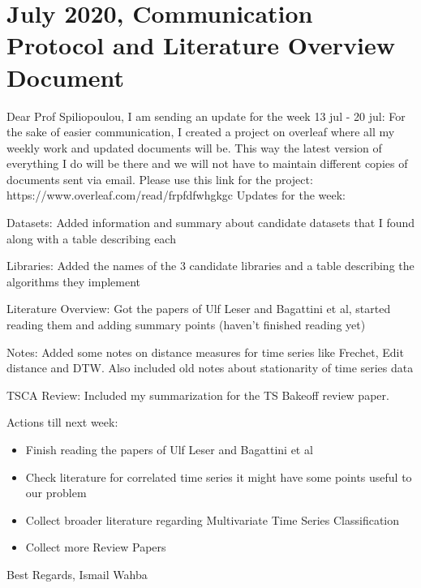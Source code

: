 \documentclass{article}
\newcommand{\cmark}{\ding{51}}%
\newcommand{\done}{\rlap{$\square$}{\raisebox{2pt}{\large\hspace{1pt}\cmark}}%
\hspace{-2.5pt}}
\begin{document}
 \section*{\texorpdfstring{}. July 2020, Communication Protocol and Literature Overview Document}
 Dear Prof Spiliopoulou,\newline
I am sending an update for the week 13 jul - 20 jul:
For the sake of easier communication, I created a project on overleaf where all my weekly work and updated documents will be. This way the latest version of everything I do will be there and we will not have to maintain different copies of documents sent via email.\newline
Please use this link for the project: https://www.overleaf.com/read/frpfdfwhgkgc
Updates for the week:
 \begin{todolist}
	\item [\done] Datasets: Added information and summary about candidate datasets that I found along with a table describing each
	\item [\done] Libraries: Added the names of the 3 candidate libraries and a table describing the algorithms they implement
	\item [\done] Literature Overview: Got the papers of Ulf Leser and Bagattini et al, started reading them and adding summary points (haven't finished reading yet)
	\item [\done] Notes: Added some notes on distance measures for time series like Frechet, Edit distance and DTW. Also included old notes about stationarity of time series data
	\item [\done] TSCA Review: Included my summarization for the TS Bakeoff review paper.
 \end{todolist}
 Actions till next week:
\begin{itemize}
	\item Finish reading the papers of Ulf Leser and Bagattini et al
	\item Check literature for correlated time series it might have some points useful to our problem
	\item Collect broader literature regarding Multivariate Time Series Classification
	\item Collect more Review Papers
\end{itemize}
Best Regards,
Ismail Wahba
\end{document}
